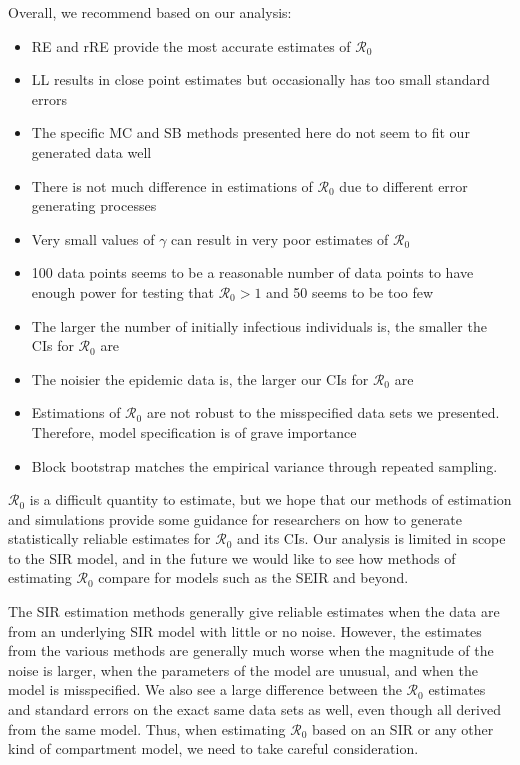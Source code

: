 \documentclass[12pt]{article}
\newcommand{\rr}{\ensuremath{\mathcal{R}_0}}
\begin{document}
Overall, we recommend based on our analysis:
\begin{itemize}
  \item RE and rRE provide the most accurate estimates of $\rr$
  \item LL results in close point estimates but occasionally has too small standard errors
  \item The specific MC and SB methods presented here do not seem to fit our generated data well
  \item There is not much difference in estimations of $\rr$ due to different error generating processes
  \item Very small values of $\gamma$ can result in very poor estimates of $\rr$
  \item 100 data points seems to be a reasonable number of data points to have enough power for testing that $\rr > 1$ and 50 seems to be too few
  \item The larger the number of initially infectious individuals is, the smaller the CIs for $\rr$ are
  \item The noisier the epidemic data is, the larger our CIs for $\rr$ are
  \item Estimations of $\rr$ are not robust to the misspecified data sets we presented.  Therefore, model specification is of grave importance
  \item Block bootstrap matches the empirical variance through repeated sampling.
  \end{itemize}

$\rr$ is a difficult quantity to estimate, but we hope that our methods of estimation and simulations provide some guidance for researchers on how to generate statistically reliable estimates for $\rr$ and its CIs.  Our analysis is limited in scope to the SIR model, and in the future we would like to see how methods of estimating $\rr$ compare for models such as the SEIR and beyond.






The SIR estimation methods generally give reliable estimates when the data are from an underlying SIR model with little or no noise. However, the estimates from the various methods are generally much worse when the magnitude of the noise is larger, when the parameters of the model are unusual, and when the model is misspecified. We also see a large difference between the $\rr$ estimates and standard errors on the exact same data sets as well, even though all derived from the same model. Thus, when estimating $\rr$ based on an SIR or any other kind of compartment model, we need to take careful consideration.


\pagebreak




\appendix
\end{document}
